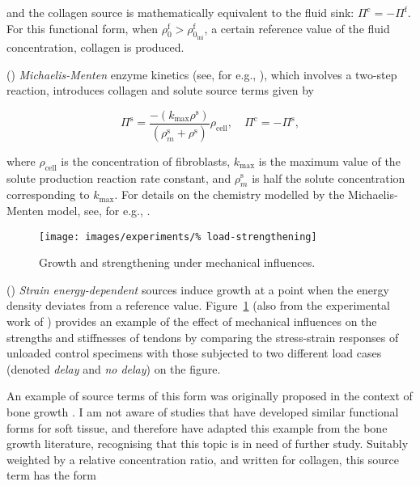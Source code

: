 \noindent and the collagen source is mathematically equivalent to the
fluid sink: $\Pi^\mathrm{c} = -\Pi^\mathrm{f}$. For this functional
form, when $\rho_{0}^\mathrm{f} > \rho_{0_\mathrm{ini}}^\mathrm{f}$, a
certain reference value of the fluid concentration, collagen is
produced.

() {\em Michaelis-Menten} enzyme kinetics (see, for
e.g., \cite{Sengersetal:2004}), which involves a two-step reaction, 
introduces collagen and solute source terms given by

\begin{equation}
\Pi^\mathrm{s} =
    \frac{-(k_{\mathrm{max}}\rho^{\mathrm{s}})}
    {(\rho^{\mathrm{s}}_m+\rho^{\mathrm{s}})}
    \rho_{\mathrm{cell}}, \quad\Pi^\mathrm{c} = -\Pi^\mathrm{s},
\label{enzyme-kinetics-source}
\end{equation}

\noindent where $\rho_{\mathrm{cell}}$ is the concentration of
fibroblasts, $k_{\mathrm{max}}$ is the maximum value of the solute
production reaction rate constant, and $\rho^{\mathrm{s}}_m$ is half
the solute concentration corresponding to $k_{\mathrm{max}}$. For
details on the chemistry modelled by the Michaelis-Menten model, see,
for e.g., \citet{sbromadill}.

\begin{figure}
  \centering
  \texttt{[image: images/experiments/\%
    load-strengthening]}
  \caption{Growth and strengthening under mechanical influences.}
  \label{load-strengthening}
\end{figure}

() {\em Strain energy-dependent} sources induce growth
at a point when the energy density deviates from a reference
value. Figure~\ref{load-strengthening} (also from the experimental
work of \citet{calveetal:07}) provides an example of the effect of
mechanical influences on the strengths and stiffnesses of tendons by
comparing the stress-strain responses of unloaded control specimens
with those subjected to two different load cases (denoted {\em delay}
and {\em no delay}) on the figure.

An example of source terms of this form was originally proposed in the
context of bone growth \citep{HarriganHamilton:93}. I am not aware of
studies that have developed similar functional forms for soft tissue,
and therefore have adapted this example from the bone growth
literature, recognising that this topic is in need of further
study. Suitably weighted by a relative concentration ratio, and
written for collagen, this source term has the form

